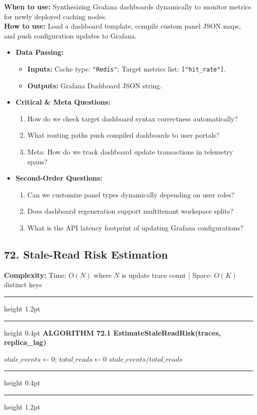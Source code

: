 \documentclass[11pt,a4paper]{article}
\newenvironment{textbookalgo}[2]{%
  \par\addvspace{1.2em}\noindent
  \hrule height 1.2pt
  \vspace{1.5pt}
  \hrule height 0.4pt
  \vspace{5pt}
  {\noindent\large\bfseries\sffamily ALGORITHM #1 \quad #2}
  \par\vspace{5pt}
  \RestyleAlgo{plain}
}{%
  \par\vspace{4pt}
  \hrule height 0.4pt
  \vspace{1.5pt}
  \hrule height 1.2pt
  \par\addvspace{1.2em}
}
\theoremstyle{definition}
\begin{document}
\noindent
\textbf{When to use:} Synthesizing Grafana dashboards dynamically to monitor metrics for newly deployed caching nodes.\\
\textbf{How to use:} Load a dashboard template, compile custom panel JSON maps, and push configuration updates to Grafana.
\begin{itemize}[leftmargin=*]
  \item[] \textbf{Data Passing:}
    \begin{itemize}
      \item \textbf{Inputs:} Cache type: \texttt{"Redis"}; Target metrics list: \texttt{["hit\_rate"]}.
      \item \textbf{Outputs:} Grafana Dashboard JSON string.
    \end{itemize}
  \item[] \textbf{Critical \& Meta Questions:}
  \begin{enumerate}
    \item How do we check target dashboard syntax correctness automatically?
    \item What routing paths push compiled dashboards to user portals?
    \item Meta: How do we track dashboard update transactions in telemetry spans?
  \end{enumerate}
  \item[] \textbf{Second-Order Questions:}
  \begin{enumerate}
    \item Can we customize panel types dynamically depending on user roles?
    \item Does dashboard regeneration support multitenant workspace splits?
    \item What is the API latency footprint of updating Grafana configurations?
  \end{enumerate}
\end{itemize}
\medskip

\clearpage
\subsection{72. Stale-Read Risk Estimation}


\noindent
\textbf{Complexity:} Time: $O(N)$ where $N$ is update trace count | Space: $O(K)$ distinct keys
\smallskip

\begin{textbookalgo}{72.1}{EstimateStaleReadRisk(traces, replica\_lag)}
\begin{algorithm}[H]
$stale\_events \leftarrow 0$; $total\_reads \leftarrow 0$\;
\Return $stale\_events / total\_reads$\;
\end{algorithm}
\end{textbookalgo}
\end{document}
